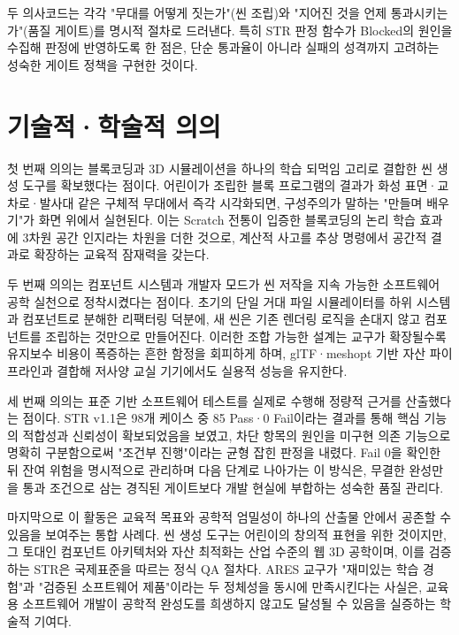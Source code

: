 두 의사코드는 각각 "무대를 어떻게 짓는가"(씬 조립)와 "지어진 것을 언제 통과시키는가"(품질 게이트)를 명시적 절차로 드러낸다. 특히 STR 판정 함수가 Blocked의 원인을 수집해 판정에 반영하도록 한 점은, 단순 통과율이 아니라 실패의 성격까지 고려하는 성숙한 게이트 정책을 구현한 것이다.

\section{기술적·학술적 의의}

첫 번째 의의는 블록코딩과 3D 시뮬레이션을 하나의 학습 되먹임 고리로 결합한 씬 생성 도구를 확보했다는 점이다. 어린이가 조립한 블록 프로그램의 결과가 화성 표면·교차로·발사대 같은 구체적 무대에서 즉각 시각화되면, 구성주의가 말하는 "만들며 배우기"가 화면 위에서 실현된다\cite{papert1980}. 이는 Scratch 전통이 입증한 블록코딩의 논리 학습 효과\cite{resnick2009scratch,brennan2012ct}에 3차원 공간 인지라는 차원을 더한 것으로, 계산적 사고를 추상 명령에서 공간적 결과로 확장하는 교육적 잠재력을 갖는다.

두 번째 의의는 컴포넌트 시스템과 개발자 모드가 씬 저작을 지속 가능한 소프트웨어 공학 실천으로 정착시켰다는 점이다. 초기의 단일 거대 파일 시뮬레이터를 하위 시스템과 컴포넌트로 분해한 리팩터링\cite{fowler2018refactoring,martin2008cleancode} 덕분에, 새 씬은 기존 렌더링 로직을 손대지 않고 컴포넌트를 조립하는 것만으로 만들어진다. 이러한 조합 가능한 설계\cite{gof1994}는 교구가 확장될수록 유지보수 비용이 폭증하는 흔한 함정을 회피하게 하며, glTF·meshopt 기반 자산 파이프라인\cite{gltf,meshopt}과 결합해 저사양 교실 기기에서도 실용적 성능을 유지한다\cite{threejs,akenine2018realtime}.

세 번째 의의는 표준 기반 소프트웨어 테스트를 실제로 수행해 정량적 근거를 산출했다는 점이다. STR v1.1은 98개 케이스 중 85 Pass·0 Fail이라는 결과를 통해 핵심 기능의 적합성과 신뢰성이 확보되었음을 보였고\cite{iso25010}, 차단 항목의 원인을 미구현 의존 기능으로 명확히 구분함으로써 "조건부 진행"이라는 균형 잡힌 판정을 내렸다\cite{iso29119,ieee829}. Fail 0을 확인한 뒤 잔여 위험을 명시적으로 관리하며 다음 단계로 나아가는 이 방식은, 무결한 완성만을 통과 조건으로 삼는 경직된 게이트보다 개발 현실에 부합하는 성숙한 품질 관리다.

마지막으로 이 활동은 교육적 목표와 공학적 엄밀성이 하나의 산출물 안에서 공존할 수 있음을 보여주는 통합 사례다. 씬 생성 도구는 어린이의 창의적 표현을 위한 것이지만, 그 토대인 컴포넌트 아키텍처와 자산 최적화는 산업 수준의 웹 3D 공학이며, 이를 검증하는 STR은 국제표준을 따르는 정식 QA 절차다. ARES 교구가 "재미있는 학습 경험"과 "검증된 소프트웨어 제품"이라는 두 정체성을 동시에 만족시킨다는 사실은, 교육용 소프트웨어 개발이 공학적 완성도를 희생하지 않고도 달성될 수 있음을 실증하는 학술적 기여다.


